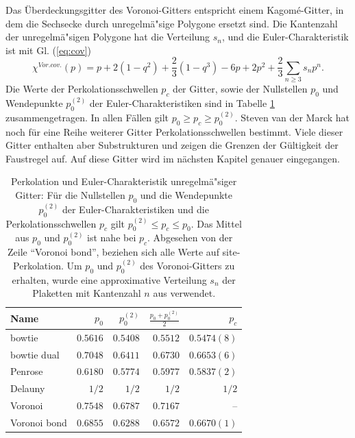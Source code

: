 Das \"Uberdeckungsgitter des Voronoi-Gitters entspricht einem Kagom\'e-Gitter, in dem die Sechsecke durch unregelm\"a"sige Polygone ersetzt sind. Die Kantenzahl der unregelm\"a"sigen Polygone hat die Verteilung $s_n$, und die Euler-Charakteristik ist mit Gl. (\ref{eq:cov}) 
\begin{equation}
\label{eq:voronoibond}
  \chi^{Vor.cov.}(p) =  p+2(1-q^2)+\frac{2}{3}(1-q^3)-6p+2p^2+\frac{2}{3}\sum_{n\geq 3}s_np^n.
\end{equation}
Die Werte der Perkolationsschwellen $p_c$ der Gitter, sowie der Nullstellen $p_0$ und Wendepunkte $p_0^{(2)}$ der Euler-Charakteristiken sind in Tabelle \ref{tab:irreg} zusammengetragen. In allen F\"allen gilt $p_0\geq p_c \geq p_0^{(2)}$. Steven van der Marck \cite{Marck:03} hat noch f\"ur eine Reihe weiterer Gitter Perkolationsschwellen bestimmt. Viele dieser Gitter enthalten aber Substrukturen und zeigen die Grenzen der G\"ultigkeit der Faustregel auf. Auf diese Gitter wird im n\"achsten Kapitel genauer eingegangen.\\
\begin{table}
\centering
\begin{tabular}{|l|r|r|r||r|}
\hline
Name &  $ p_0$&$p_0^{(2)}$&$\frac{p_0+p_0^{(2)}}{2}$&$p_c$ \\ \hline
\hline
bowtie & $0.5616$ &$0.5408$&$0.5512$&$0.5474(8)$\cite{Marck:97} \\ \hline
bowtie dual & $0.7048$&$0.6411$&$0.6730$&$0.6653(6)$\cite{Marck:97} \\ \hline
Penrose &  $0.6180$&$0.5774$&$0.5977$&$0.5837(2)$\cite{Yonezawa:88} \\ \hline
Delauny & $1/2$ & $1/2$ & $1/2$&$1/2$ \\ \hline
Voronoi &$0.7548$&$0.6787$&$0.7167$&-- \\ \hline
Voronoi bond  & $0.6855$&$0.6288$&$0.6572$&$0.6670(1)$\cite{Hsu:99}  \\ \hline
\end{tabular}
\caption{Perkolation und Euler-Charakteristik unregelm\"a"siger Gitter: F\"ur die Nullstellen $p_0$ und die Wendepunkte $p_0^{(2)}$ der Euler-Charakteristiken und die Perkolationsschwellen $p_c$ gilt $p_0^{(2)}\leq p_c\leq p_0$. Das Mittel aus $p_0$ und $p_0^{(2)}$ ist nahe bei $p_c$. Abgesehen von der Zeile ``Voronoi bond'', beziehen sich alle Werte auf site-Perkolation. Um $p_0$ und $p_0^{(2)}$ des Voronoi-Gitters zu erhalten, wurde eine approximative Verteilung $s_n$ der Plaketten mit Kantenzahl $n$ aus \cite{Stoyan:96} verwendet.}
\label{tab:irreg}
\end{table}


